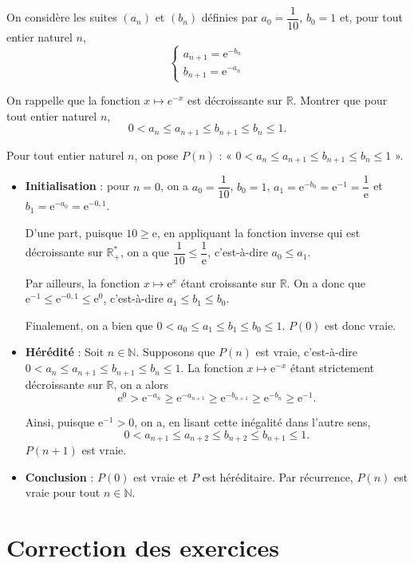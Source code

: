 \documentclass[11pt,fleqn]{book} %
\begin{document}
\begin{exercise}[subtitle={(Centres étrangers 2022)}]
On considère les suites \((a_n)\) et \((b_n)\) définies par \(a_0= \dfrac{1}{10}\), \(b_0=1\) et, pour tout entier naturel \(n\), \[\left\{\begin{array}{l}a_{n+1}=\mathrm{e}^{-b_n}\\b_{n+1}=\mathrm{e}^{-a_n}\end{array}\right.\]

On rappelle que la fonction \(x\mapsto e^{-x}\) est décroissante sur \(\mathbb{R}\). Montrer que pour tout entier naturel \(n\), 
\[ 0 < a_n \leqslant a_{n+1} \leqslant b_{n+1} \leqslant b_n \leqslant 1 .\]\end{exercise}

\begin{solution}Pour tout entier naturel \(n\), on pose \(P(n)\) : « \(0 < a_n \leqslant a_{n+1} \leqslant b_{n+1} \leqslant b_n \leqslant 1\) ».

\begin{itemize} \item \textbf{Initialisation} : pour \(n=0\), on a \(a_0=\dfrac{1}{10}\), \(b_0=1\), \(a_1 =\mathrm{e}^{-b_0}=\mathrm{e}^{-1}=\dfrac{1}{\mathrm{e}}\) et \(b_1=\mathrm{e}^{-a_0}=\mathrm{e}^{-0,1}\).

D'une part, puisque \( 10 \geqslant \mathrm{e}\), en appliquant la fonction inverse qui est décroissante sur \(\mathbb{R}^*_+\), on a que \(\dfrac{1}{10} \leqslant \dfrac{1}{\mathrm{e}}\), c'est-à-dire \(a_0 \leqslant a_1\). 

Par ailleurs, la fonction \(x \mapsto \mathrm{e}^{x}\) étant croissante sur \(\mathbb{R}\). On a donc que \(\mathrm{e}^{-1} \leqslant \mathrm{e}^{-0,1} \leqslant \mathrm{e}^0\), c'est-à-dire \(a_1 \leqslant b_1 \leqslant b_0\). 

Finalement, on a bien que \( 0< a_0 \leqslant a_1 \leqslant b_1 \leqslant b_0 \leqslant 1\). \(P(0)\) est donc vraie.

\item \textbf{Hérédité} : Soit \(n\in\mathbb{N}\). Supposons que \(P(n)\) est vraie, c'est-à-dire \(0 < a_n \leqslant a_{n+1} \leqslant b_{n+1} \leqslant b_n \leqslant 1\). La fonction \( x \mapsto \mathrm{e}^{-x}\) étant strictement décroissante sur \(\mathbb{R}\), on a alors 
\[\mathrm{e}^0 > \mathrm{e}^{-a_n} \geqslant \mathrm{e}^{-a_{n+1}} \geqslant \mathrm{e}^{-b_{n+1}} \geqslant \mathrm{e}^{-b_n} \geqslant \mathrm{e}^{-1}.\]

Ainsi, puisque \(\mathrm{e}^{-1} > 0\), on a, en lisant cette inégalité dans l'autre sens,
\[0 < a_{n+1} \leqslant a_{n+2} \leqslant b_{n+2} \leqslant b_{n+1} \leqslant 1.\]
\(P(n+1)\) est vraie.
\item \textbf{Conclusion} : \(P(0)\) est vraie et \(P\) est héréditaire. Par récurrence, \(P(n)\) est vraie pour tout \(n\in\mathbb{N}\).
\end{itemize}\end{solution}



\chapter{Correction des exercices}

\printsolutions[headings={false}]
\end{document}
